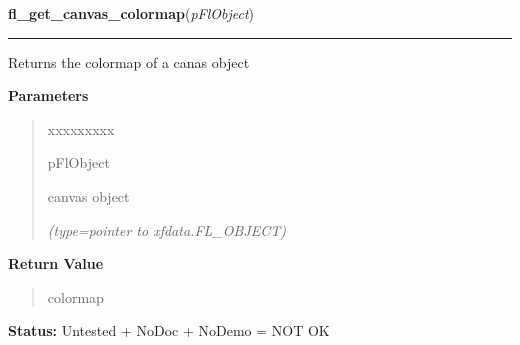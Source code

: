 \hspace{.8\funcindent}\begin{boxedminipage}{\funcwidth}

    \raggedright \textbf{fl\_get\_canvas\_colormap}(\textit{pFlObject})

    \vspace{-1.5ex}

    \rule{\textwidth}{0.5\fboxrule}
\setlength{\parskip}{2ex}
    Returns the colormap of a canas object

\setlength{\parskip}{1ex}
      \textbf{Parameters}
      \vspace{-1ex}

      \begin{quote}
        \begin{Ventry}{xxxxxxxxx}

          \item[pFlObject]

          canvas object

            {\it (type=pointer to xfdata.FL\_OBJECT)}

        \end{Ventry}

      \end{quote}

      \textbf{Return Value}
    \vspace{-1ex}

      \begin{quote}
      colormap

      \end{quote}

\textbf{Status:} Untested + NoDoc + NoDemo = NOT OK



    \end{boxedminipage}

    \label{xformslib:flcanvas:fl_get_canvas_depth}

    \vspace{0.5ex}

